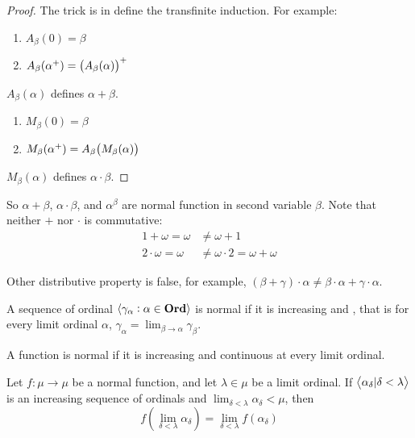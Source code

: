 \begin{proof}
    The trick is in define the transfinite induction. For example:
    \begin{enumerate}
        \item $A_\beta (0)= \beta$
        \item $A_\beta (\alpha^{+})= \mleft(A_\beta (\alpha) \mright)^{+}$
    \end{enumerate}
    $A_\beta(\alpha)$ defines $\alpha + \beta$.
    \begin{enumerate}
        \item $M_\beta (0)= \beta$
        \item $M_\beta (\alpha^{+})= A_\beta \mleft(M_\beta (\alpha)\mright)$
    \end{enumerate}
    $M_\beta(\alpha)$ defines $\alpha \cdot \beta$.    
\end{proof}


So $\alpha + \beta$, $\alpha \cdot \beta$, and $\alpha^\beta$ are normal function in second variable $\beta$. Note that neither $+$ nor $\cdot$ is commutative:
    \begin{equation*}
        \begin{aligned}
            1 + \omega = \omega &\neq \omega + 1 \\
            2 \cdot \omega = \omega &\neq \omega \cdot 2 = \omega + \omega
        \end{aligned}
    \end{equation*}

Other distributive property is false, for example, $(\beta + \gamma) \cdot  \alpha \neq \beta \cdot \alpha + \gamma \cdot \alpha$.


\begin{definition}
    A sequence of ordinal $\transfinitesequence{\gamma_\alpha : \alpha \in \allordinals}$ is normal if it is increasing and , that is for every limit ordinal $\alpha$, $\displaystyle \gamma_\alpha = \lim_{\beta \rightarrow \alpha} \gamma_\beta$.
\end{definition}

\begin{definition}
    A function is normal if it is increasing and continuous at every limit ordinal.
\end{definition}

\begin{theorem}
    Let $f: \mu \rightarrow \mu$ be a normal function, and let $\lambda \in \mu $ be a limit ordinal. If $\transfinitesequence{\alpha_\delta | \delta < \lambda}$ is an increasing sequence of ordinals and $ \displaystyle \lim_{\delta < \lambda} \alpha_\delta < \mu$, then
    \begin{equation}
        f(\lim_{\delta < \lambda} \alpha_\delta) =  \lim_{\delta < \lambda} f(\alpha_\delta) 
    \end{equation}
\end{theorem}

